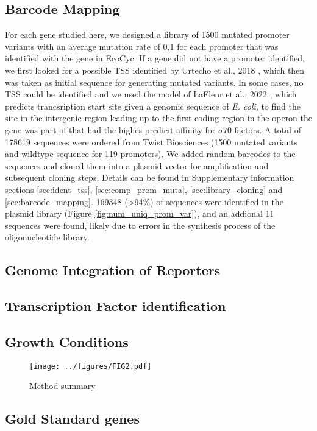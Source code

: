 \subsection{Barcode Mapping}
For each gene studied here, we designed a library of 1500 mutated promoter variants with an average mutation rate of 0.1 for each promoter that was identified with the gene in EcoCyc. If a gene did not have a promoter identified, we first looked for a possible TSS identified by Urtecho et al., 2018 \cite{urtecho2018systematic}, which then was taken as initial sequence for generating mutated variants. In some cases, no TSS could be identified and we used the model of LaFleur et al., 2022 \cite{lafleur2022automated}, which predicts trancsription start site given a genomic sequence of \textit{E. coli}, to find the site in the intergenic region leading up to the first coding region in the operon the gene was part of that had the highes predicit affinity for $\sigma70$-factors. A total of 178619 sequences were ordered from Twist Biosciences (1500 mutated variants and wildtype sequence for 119 promoters). We added random barcodes to the sequences and cloned them into a plasmid vector for amplification and subsequent cloning steps. Details can be found in Supplementary information sections \ref{sec:ident_tss}, \ref{sec:comp_prom_muta}, \ref{sec:library_cloning} and  \ref{sec:barcode_mapping}. 169348 (>94\%) of sequences were identified in the plasmid library (Figure \ref{fig:num_uniq_prom_var}), and an addional 11 sequences were found, likely due to errors in the synthesis process of the oligonucleotide library. 


\subsection{Genome Integration of Reporters}




\subsection{Transcription Factor identification}
\subsection{Growth Conditions}
\begin{figure}
    \centering
    \texttt{[image: ../figures/FIG2.pdf]}
    \caption{Method summary}
    \label{fig:method_sum}
\end{figure}
\subsection{Gold Standard genes}

